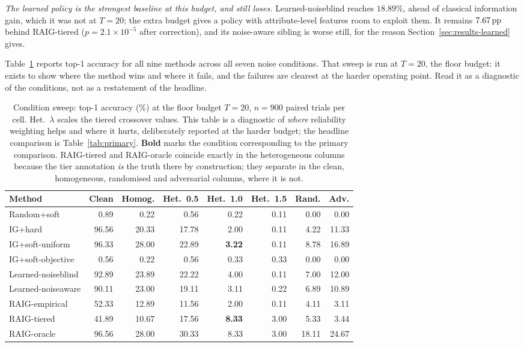\emph{The learned policy is the strongest baseline at this budget, and still
loses.} Learned-noiseblind reaches $18.89\%$, ahead of classical information
gain, which it was not at $T=20$; the extra budget gives a policy with
attribute-level features room to exploit them. It remains $7.67\,\text{pp}$ behind
RAIG-tiered ($p = 2.1\times10^{-5}$ after correction), and its noise-aware
sibling is worse still, for the reason Section~\ref{sec:results-learned} gives.

Table~\ref{tab:main} reports top-1 accuracy for all nine methods across all
seven noise conditions. That sweep is run at $T=20$, the floor budget: it exists
to show where the method wins and where it fails, and the failures are clearest
at the harder operating point. Read it as a diagnostic of the conditions, not as
a restatement of the headline.

\begin{table}[t]
\caption{Condition sweep: top-1 accuracy (\%) at the floor budget $T=20$,
$n=900$ paired trials per cell. Het.\ $\lambda$ scales the tiered crossover
values. This table is a diagnostic of \emph{where} reliability weighting helps
and where it hurts, deliberately reported at the harder budget; the headline
comparison is Table~\ref{tab:primary}. \textbf{Bold} marks the condition
corresponding to the primary comparison. RAIG-tiered and RAIG-oracle coincide
exactly in the heterogeneous columns because the tier annotation \emph{is} the
truth there by construction; they separate in the clean, homogeneous,
randomised and adversarial columns, where it is not.}
\label{tab:main}
\centering
\footnotesize
\begin{tabular}{@{}lrrrrrrr@{}}
\toprule
\textbf{Method} & \textbf{Clean} & \textbf{Homog.} &
\textbf{Het.\ 0.5} & \textbf{Het.\ 1.0} & \textbf{Het.\ 1.5} &
\textbf{Rand.} & \textbf{Adv.} \\
\midrule
Random+soft        & 0.89  & 0.22  & 0.56  & 0.22          & 0.11 & 0.00  & 0.00  \\
IG+hard            & 96.56 & 20.33 & 17.78 & 2.00          & 0.11 & 4.22  & 11.33 \\
IG+soft-uniform    & 96.33 & 28.00 & 22.89 & \textbf{3.22} & 0.11 & 8.78  & 16.89 \\
IG+soft-objective  & 0.56  & 0.22  & 0.56  & 0.33          & 0.33 & 0.00  & 0.00  \\
Learned-noiseblind & 92.89 & 23.89 & 22.22 & 4.00          & 0.11 & 7.00  & 12.00 \\
Learned-noiseaware & 90.11 & 23.00 & 19.11 & 3.11          & 0.22 & 6.89  & 10.89 \\
RAIG-empirical     & 52.33 & 12.89 & 11.56 & 2.00          & 0.11 & 4.11  & 3.11  \\
RAIG-tiered        & 41.89 & 10.67 & 17.56 & \textbf{8.33} & 3.00 & 5.33  & 3.44  \\
RAIG-oracle        & 96.56 & 28.00 & 30.33 & 8.33          & 3.00 & 18.11 & 24.67 \\
\bottomrule
\end{tabular}
\end{table}

